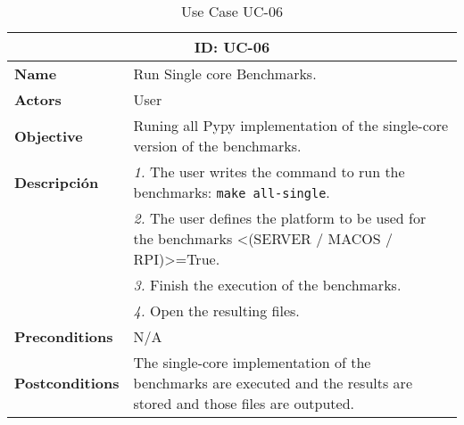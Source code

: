 \begin{table}[H]
    \centering
    \begin{tabular}{l p{10cm}}
        \toprule
        \multicolumn{2}{c}{\textbf{ID: UC-06}} \\
        \toprule
        \textbf{Name}                         &  Run Single core Benchmarks. \\
        \textbf{Actors}                       &  User \\
        \textbf{Objective}                    &  Runing all Pypy implementation of the single-core version of the benchmarks. \\
        \multirow{1}{*}{\textbf{Descripción}} & \textsl{1.} The user writes the command to run the benchmarks: \texttt{make all-single}.\\
                                              & \textsl{2.} The user defines the platform to be used for the benchmarks <(SERVER / MACOS / RPI)>=True.\\
                                              & \textsl{3.} Finish the execution of the benchmarks.\\
                                              & \textsl{4.} Open the resulting files.\\ 
        \textbf{Preconditions}                &  N/A \\
        \textbf{Postconditions}               &  The single-core implementation of the benchmarks are executed and the results are stored and those files are outputed. \\
    \end{tabular}
    \caption{Use Case UC-06}
    \label{tab:uc-06}
\end{table}

